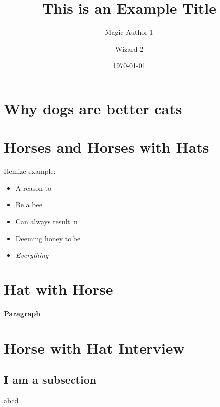\documentclass[a3paper, portrait, default]{uulm-cs-poster}
\title{This is an Example Title}
\author{Magic Author 1\and Wizard 2}
\institute{The Amazing Institute}
\date{\today}
\begin{document}
\maketitle
\section*{Why dogs are better cats}
\lipsum[2]
\vfil
\begin{multicols}{3}
\section*{Horses and Horses with Hats}
   \lipsum[1-3]
   Itemize example:
   \begin{itemize}
      \item A reason to
      \item Be a bee
      \item Can always result in
      \item Deeming honey to be
      \item \textit{Everything}
   \end{itemize}
\section*{Hat with Horse}
   \lipsum[4-6]
   \paragraph{Paragraph}\lipsum[7]
\end{multicols}
\lipsum[2]
\section*{Horse with Hat Interview}
\begin{multicols}{4}
   \lipsum[2]
   \subsection*{I am a subsection}
   abcd
\end{multicols}
\end{document}
